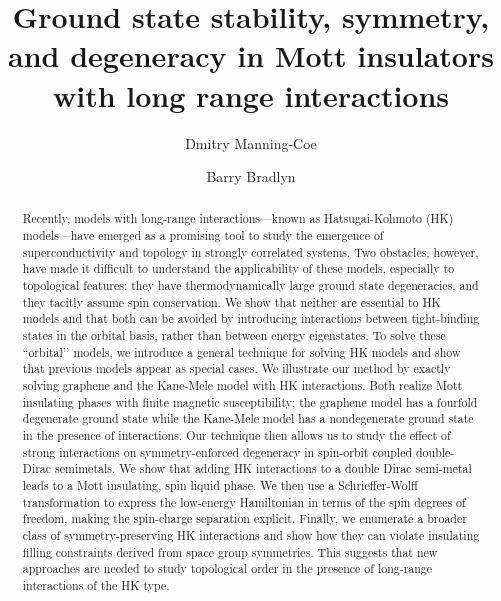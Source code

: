 \documentclass[prb,aps,amssymb,twocolumn,notitlepage]{revtex4-2}
\begin{document}
\title{Ground state stability, symmetry, and degeneracy in Mott insulators with long range interactions}


\author{Dmitry Manning-Coe}

\author{Barry Bradlyn}


\begin{abstract}
Recently, models with long-range interactions---known as Hatsugai-Kohmoto (HK) models---have emerged as a promising tool to study the emergence of superconductivity and topology in strongly correlated systems. 
Two obstacles, however, have made it difficult to understand the applicability of these models, especially to topological features: they have thermodynamically large ground state degeneracies, and they tacitly assume spin conservation. 
We show that neither are essential to HK models and that both can be avoided by introducing interactions between tight-binding states in the orbital basis, rather than between energy eigenstates. 
To solve these ``orbital’’ models, we introduce a general technique for solving HK models and show that previous models appear as special cases. 
We illustrate our method by exactly solving graphene and the Kane-Mele model with HK interactions. 
Both realize Mott insulating phases with finite magnetic susceptibility; the graphene model has a fourfold degenerate ground state while the Kane-Mele model has a nondegenerate ground state in the presence of interactions. 
Our technique then allows us to study the effect of strong interactions on symmetry-enforced degeneracy in spin-orbit coupled double-Dirac semimetals. 
We show that adding HK interactions to a double Dirac semi-metal leads to a Mott insulating, spin liquid phase. 
We then use a Schrieffer-Wolff transformation to express the low-energy Hamiltonian in terms of the spin degrees of freedom, making the spin-charge separation explicit. 
Finally, we enumerate a broader class of symmetry-preserving HK interactions and show how they can violate insulating filling constraints derived from space group symmetries. 
This suggests that new approaches are needed to study topological order in the presence of long-range interactions of the HK type.


\end{abstract}
\maketitle
\end{document}

